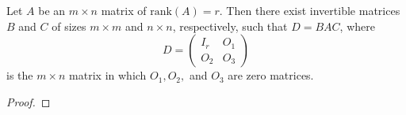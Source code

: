 \begin{corollary}
    Let \( A  \) be an \( m \times n  \) matrix of \( \text{rank}(A) = r \). Then there exist invertible matrices \( B  \) and \( C  \) of sizes \( m \times m  \) and \( n \times n  \), respectively, such that \( D = BAC  \), where 
    \[  D = \begin{pmatrix} 
        {I}_{r} & {O}_{1} \\
        {O}_{2} & {O}_{3}
              \end{pmatrix}  \] is the \( m \times n  \) matrix in which \( {O}_{1}, {O}_{2},  \) and \( {O}_{3}  \) are zero matrices.
\end{corollary}
\begin{proof}

\end{proof}
